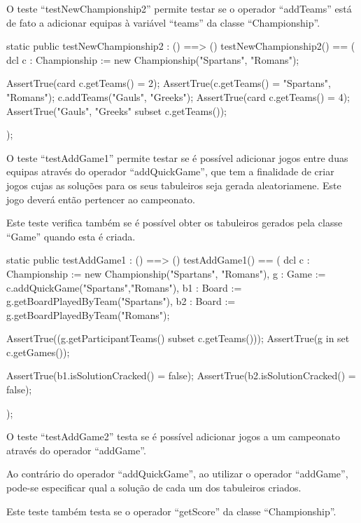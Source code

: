 O teste ``testNewChampionship2'' permite testar se o operador
``addTeams'' está de fato a adicionar equipas à variável ``teams'' da
classe ``Championship''.

\begin{vdm_al}  
    static public testNewChampionship2 : () ==> ()
    testNewChampionship2() ==
      ( dcl c : Championship := new Championship({"Spartans", "Romans"});
  
        AssertTrue(card c.getTeams() = 2);
        AssertTrue(c.getTeams() = {"Spartans", "Romans"});
        c.addTeams({"Gauls", "Greeks"});
        AssertTrue(card c.getTeams() = 4);
        AssertTrue({"Gauls", "Greeks"} subset c.getTeams());
  
      );
\end{vdm_al}  

O teste ``testAddGame1'' permite testar se é possível adicionar jogos
entre duas equipas através do operador ``addQuickGame'', que tem a
finalidade de criar jogos cujas as soluções para os seus tabuleiros
seja gerada aleatoriamene. Este jogo deverá então pertencer ao
campeonato.

Este teste verifica também se é possível obter os tabuleiros gerados
pela classe ``Game'' quando esta é criada.

\begin{vdm_al}  
    static public testAddGame1 : () ==> ()
    testAddGame1() ==
      ( dcl c : Championship := new Championship({"Spartans", "Romans"}),
        g  : Game  := c.addQuickGame("Spartans","Romans"),
        b1 : Board := g.getBoardPlayedByTeam("Spartans"),
        b2 : Board := g.getBoardPlayedByTeam("Romans");
  
        AssertTrue((g.getParticipantTeams() subset c.getTeams()));
        AssertTrue(g in set c.getGames());
  
        AssertTrue(b1.isSolutionCracked() = false);
        AssertTrue(b2.isSolutionCracked() = false);
  
      );
\end{vdm_al}

O teste ``testAddGame2'' testa se é possível adicionar jogos a um
campeonato através do operador ``addGame''.

Ao contrário do operador ``addQuickGame'', ao utilizar o operador
``addGame'', pode-se especificar qual a solução de cada um dos
tabuleiros criados.

Este teste também testa se o operador ``getScore'' da classe ``Championship''.
  
